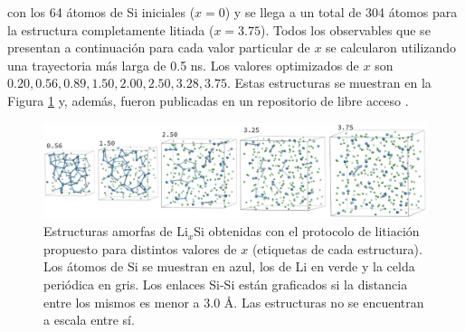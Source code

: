 con los 64 átomos de Si iniciales ($x=0$) y se llega a un total de 304 átomos
para la estructura completamente litiada ($x=3.75$). Todos los observables que
se presentan a continuación para cada valor particular de $x$ se calcularon 
utilizando una trayectoria más larga de 0.5 ns. Los valores optimizados de $x$
son $0.20, 0.56, 0.89, 1.50, 2.00, 2.50, 3.28, 3.75$. Estas estructuras se 
muestran en la Figura \ref{fig:litiacion} y, además, fueron publicadas en un 
repositorio de libre acceso \cite{dftb_lisi_amorphous}.
\begin{figure}[h!]
    \centering
    \includegraphics[width=\textwidth]{Silicio/prediccion/metodos/litiacion.png}
    \caption{Estructuras amorfas de Li$_x$Si obtenidas con el protocolo de litiación
    propuesto para distintos valores de $x$ (etiquetas de cada estructura). Los 
    átomos de Si se muestran en azul, los de Li en verde y la celda periódica en 
    gris. Los enlaces Si-Si están graficados si la distancia entre los mismos es
    menor a 3.0 \AA. Las estructuras no se encuentran a escala entre sí.}
    \label{fig:litiacion}
\end{figure}
